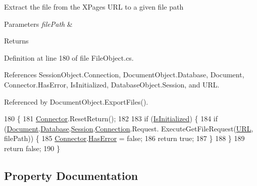 Extract the file from the X\+Pages U\+RL to a given file path 


\begin{DoxyParams}{Parameters}
{\em file\+Path} & \\
\hline
\end{DoxyParams}
\begin{DoxyReturn}{Returns}

\end{DoxyReturn}


Definition at line 180 of file File\+Object.\+cs.



References Session\+Object.\+Connection, Document\+Object.\+Database, Document, Connector.\+Has\+Error, Is\+Initialized, Database\+Object.\+Session, and U\+RL.



Referenced by Document\+Object.\+Export\+Files().


\begin{DoxyCode}
180                                              \{
181         \mbox{\hyperlink{class_connector}{Connector}}.ResetReturn();
182 
183         \textcolor{keywordflow}{if} (\mbox{\hyperlink{class_file_object_a36ff6c07d0662885402bfe7d98cf2988}{IsInitialized}}) \{
184             \textcolor{keywordflow}{if} (\mbox{\hyperlink{class_file_object_a0c9650a6ae1efb95f8211f9fa3b883fe}{Document}}.\mbox{\hyperlink{class_document_object_a69d5338c9835f748490323d2950eed09}{Database}}.\mbox{\hyperlink{class_database_object_aa8484162b7d2a7c4c9426bca13c64c07}{Session}}.\mbox{\hyperlink{class_session_object_a014bdbf705a753540e19bfb53030c55c}{Connection}}.Request.
      ExecuteGetFileRequest(\mbox{\hyperlink{class_file_object_a7355eaeea3fe40bd8862d7f1f9b479da}{URL}}, filePath)) \{
185                 \mbox{\hyperlink{class_connector}{Connector}}.\mbox{\hyperlink{class_connector_a9365777a6b7b711b75bcfa6c4d53e989}{HasError}} = \textcolor{keyword}{false};
186                 \textcolor{keywordflow}{return} \textcolor{keyword}{true};
187             \}
188         \}
189         \textcolor{keywordflow}{return} \textcolor{keyword}{false};
190     \}
\end{DoxyCode}


\subsection{Property Documentation}
\mbox{\label{class_file_object_a39640cdc4b16ee66e9c73803f4510396}} 
